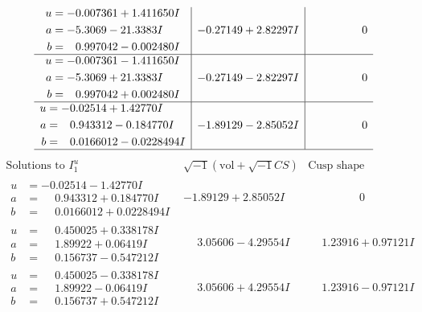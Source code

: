 \documentclass[1p]{elsarticle_modified}
\theoremstyle{definition}
\newcommand{\I}{\sqrt{-1}}
\begin{document}
$$\begin{array}{c|c|c}
\begin{aligned}
u &= -0.007361 + 1.411650 I \\
a &= -5.3069 - 21.3383 I \\
b &= \phantom{-}0.997042 - 0.002480 I\end{aligned}
 & -0.27149 + 2.82297 I & \phantom{-0.000000 } 0 \\ \hline\begin{aligned}
u &= -0.007361 - 1.411650 I \\
a &= -5.3069 + 21.3383 I \\
b &= \phantom{-}0.997042 + 0.002480 I\end{aligned}
 & -0.27149 - 2.82297 I & \phantom{-0.000000 } 0 \\ \hline\begin{aligned}
u &= -0.02514 + 1.42770 I \\
a &= \phantom{-}0.943312 - 0.184770 I \\
b &= \phantom{-}0.0166012 - 0.0228494 I\end{aligned}
 & -1.89129 - 2.85052 I & \phantom{-0.000000 } 0\\
 \hline 
 \end{array}$$\newpage$$\begin{array}{c|c|c}  
\text{Solutions to }I^u_{1}& \I (\text{vol} + \sqrt{-1}CS) & \text{Cusp shape}\\
 \hline 
\begin{aligned}
u &= -0.02514 - 1.42770 I \\
a &= \phantom{-}0.943312 + 0.184770 I \\
b &= \phantom{-}0.0166012 + 0.0228494 I\end{aligned}
 & -1.89129 + 2.85052 I & \phantom{-0.000000 } 0 \\ \hline\begin{aligned}
u &= \phantom{-}0.450025 + 0.338178 I \\
a &= \phantom{-}1.89922 + 0.06419 I \\
b &= \phantom{-}0.156737 - 0.547212 I\end{aligned}
 & \phantom{-}3.05606 - 4.29554 I & \phantom{-}1.23916 + 0.97121 I \\ \hline\begin{aligned}
u &= \phantom{-}0.450025 - 0.338178 I \\
a &= \phantom{-}1.89922 - 0.06419 I \\
b &= \phantom{-}0.156737 + 0.547212 I\end{aligned}
 & \phantom{-}3.05606 + 4.29554 I & \phantom{-}1.23916 - 0.97121 I \\ \hline\begin{aligned}

\end{aligned}
\end{array}$$
\end{document}
